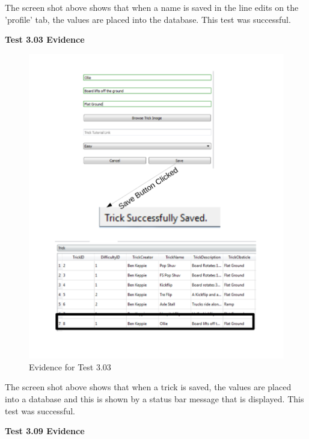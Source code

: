 The screen shot above shows that when a name is saved in the line edits on the 'profile' tab, the values are placed into the database. This test was successful.

\textbf{Test 3.03 Evidence}

\begin{figure}[H]
    \includegraphics[width=\textwidth]{./Testing/AnnotatedSamples/Test303.pdf}
    \caption{Evidence for Test 3.03} \label{fig:Test 3.03}
\end{figure}

The screen shot above shows that when a trick is saved, the values are placed into a database and this is shown by a status bar message that is displayed. This test was successful.

\textbf{Test 3.09 Evidence}

